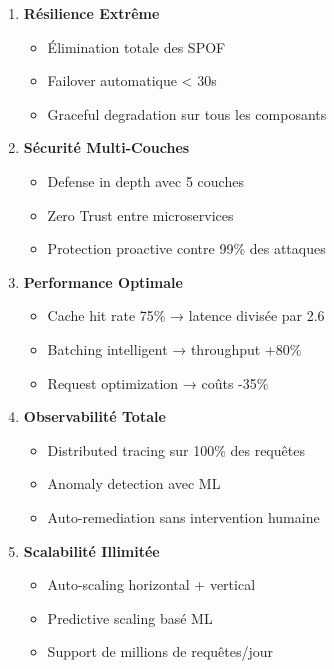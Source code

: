 \documentclass[12pt,a4paper]{article}
\begin{document}
\begin{tcolorbox}[colback=green!5,colframe=green!50!black,title=\textbf{Forces Clés}]
\begin{enumerate}[leftmargin=1.5cm]
    \item \textbf{Résilience Extrême}
    \begin{itemize}[noitemsep]
        \item Élimination totale des SPOF
        \item Failover automatique < 30s
        \item Graceful degradation sur tous les composants
    \end{itemize}
    
    \item \textbf{Sécurité Multi-Couches}
    \begin{itemize}[noitemsep]
        \item Defense in depth avec 5 couches
        \item Zero Trust entre microservices
        \item Protection proactive contre 99\% des attaques
    \end{itemize}
    
    \item \textbf{Performance Optimale}
    \begin{itemize}[noitemsep]
        \item Cache hit rate 75\% → latence divisée par 2.6
        \item Batching intelligent → throughput +80\%
        \item Request optimization → coûts -35\%
    \end{itemize}
    
    \item \textbf{Observabilité Totale}
    \begin{itemize}[noitemsep]
        \item Distributed tracing sur 100\% des requêtes
        \item Anomaly detection avec ML
        \item Auto-remediation sans intervention humaine
    \end{itemize}
    
    \item \textbf{Scalabilité Illimitée}
    \begin{itemize}[noitemsep]
        \item Auto-scaling horizontal + vertical
        \item Predictive scaling basé ML
        \item Support de millions de requêtes/jour
    \end{itemize}
\end{enumerate}
\end{tcolorbox}
\end{document}
